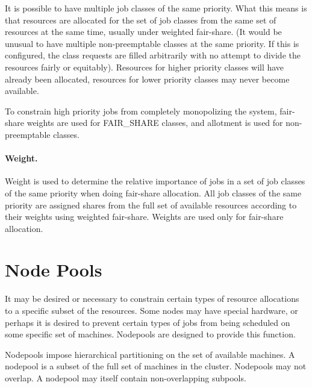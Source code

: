    It is possible to have multiple job classes of the same priority. What this means is that resources 
    are allocated for the set of job classes from the same set of resources at the same time, usually
    under weighted fair-share. (It would be unusual to have multiple non-preemptable classes at the
    same priority.  If this is configured, the class requests are filled arbitrarily with no attempt
    to divide the resources fairly or equitably). Resources for higher priority 
    classes will have already been allocated, resources for lower priority classes may never become 
    available. 
    
    To constrain high priority jobs from completely monopolizing the
    system, fair-share weights are used for FAIR\_SHARE classes, and 
    allotment is used for non-preemptable classes. 

    \paragraph{Weight.} Weight is used to determine the relative importance of jobs in a set of job classes of 
    the same priority when doing fair-share allocation. All job classes of the same priority are assigned 
    shares from the full set of available resources according to their weights using weighted fair-share. 
    Weights are used only for fair-share allocation. 
    
    \section{Node Pools}
    It may be desired or necessary to constrain certain types of resource allocations to a specific
    subset of the resources. Some nodes may have special hardware, or perhaps it is desired to
    prevent certain types of jobs from being scheduled on some specific set of machines. Nodepools
    are designed to provide this function.

    Nodepools impose hierarchical partitioning on the set of available machines. A nodepool is a
    subset of the full set of machines in the cluster. Nodepools may not overlap. A nodepool may
    itself contain non-overlapping subpools. 


